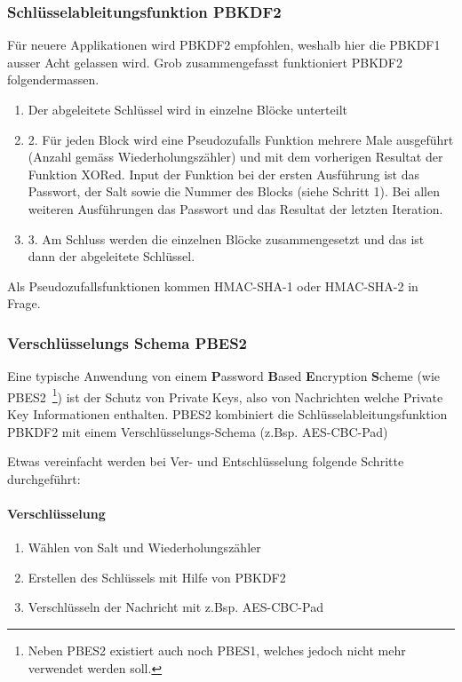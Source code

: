 \documentclass[10pt,a4paper]{article}
\begin{document}
\subsubsection{Schlüsselableitungsfunktion PBKDF2}
Für neuere Applikationen wird PBKDF2 empfohlen, weshalb hier die PBKDF1 ausser Acht
gelassen wird. Grob zusammengefasst funktioniert PBKDF2 folgendermassen.
\begin{enumerate}
    \item Der abgeleitete Schlüssel wird in einzelne Blöcke unterteilt
    \item 2. Für jeden Block wird eine Pseudozufalls Funktion mehrere Male ausgeführt
        (Anzahl gemäss Wiederholungszähler) und mit dem vorherigen Resultat der Funktion
        XORed. Input der Funktion bei der ersten Ausführung ist das Passwort, der Salt
        sowie die Nummer des Blocks (siehe Schritt 1). Bei allen weiteren Ausführungen das
        Passwort und das Resultat der letzten Iteration.
    \item 3. Am Schluss werden die einzelnen Blöcke zusammengesetzt und das ist dann der
        abgeleitete Schlüssel.
\end{enumerate}

Als Pseudozufallsfunktionen kommen HMAC-SHA-1 oder HMAC-SHA-2 in Frage.

\subsubsection{Verschlüsselungs Schema PBES2}
Eine typische Anwendung von einem \textbf{P}assword \textbf{B}ased \textbf{E}ncryption
\textbf{S}cheme (wie PBES2~\footnote{Neben PBES2 existiert auch noch PBES1, welches jedoch
nicht mehr verwendet werden soll.}) ist der Schutz von Private Keys, also von Nachrichten
welche Private Key Informationen enthalten. PBES2 kombiniert die
Schlüsselableitungsfunktion PBKDF2 mit einem Verschlüsselungs-Schema (z.Bsp. AES-CBC-Pad)

Etwas vereinfacht werden bei Ver- und Entschlüsselung folgende Schritte durchgeführt:
\paragraph{Verschlüsselung}
\begin{enumerate}
    \item Wählen von Salt und Wiederholungszähler
    \item Erstellen des Schlüssels mit Hilfe von PBKDF2
    \item Verschlüsseln der Nachricht mit z.Bsp. AES-CBC-Pad
\end{enumerate}
\end{document}
